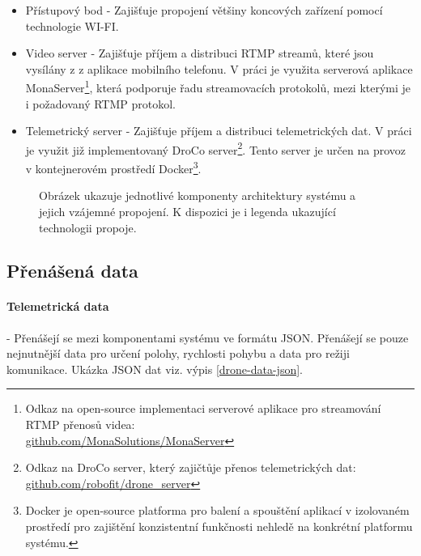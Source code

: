 \begin{itemize}
    \item Přístupový bod - Zajišťuje propojení většiny koncových zařízení pomocí technologie WI-FI.
    
    \item Video server - Zajišťuje příjem a distribuci RTMP streamů, které jsou vysílány z z aplikace mobilního telefonu. V práci je využita serverová aplikace MonaServer\footnote{Odkaz na open-source implementaci serverové aplikace pro streamování RTMP přenosů videa: \\ \href{https://github.com/MonaSolutions/MonaServer}{github.com/MonaSolutions/MonaServer}}, která podporuje řadu streamovacích protokolů, mezi kterými je i požadovaný RTMP protokol.
   
    \item Telemetrický server - Zajišťuje příjem a distribuci telemetrických dat. V práci je využit již implementovaný DroCo server\footnote{Odkaz na DroCo server, který zajičtůje přenos telemetrických dat: \href{https://github.com/robofit/drone_server}{github.com/robofit/drone\_server}}. Tento server je určen na provoz v kontejnerovém prostředí Docker\footnote{Docker je open-source platforma pro balení a  spouštění aplikací v izolovaném prostředí pro zajištění konzistentní funkčnosti nehledě na konkrétní platformu systému.}.
\end{itemize}

\begin{figure}[ht]
    \centering
    
    \caption{Obrázek ukazuje jednotlivé komponenty architektury systému  a  jejich vzájemné propojení. K dispozici je i legenda ukazující technologii  propoje. }
    \label{pic:ekosystem}
\end{figure}

\subsection{Přenášená data}

\paragraph{Telemetrická data} - Přenášejí se mezi komponentami systému ve formátu JSON. Přenášejí se pouze nejnutnější data pro určení polohy, rychlosti pohybu a data pro režiji komunikace. Ukázka JSON dat viz. výpis \ref{drone-data-json}.
